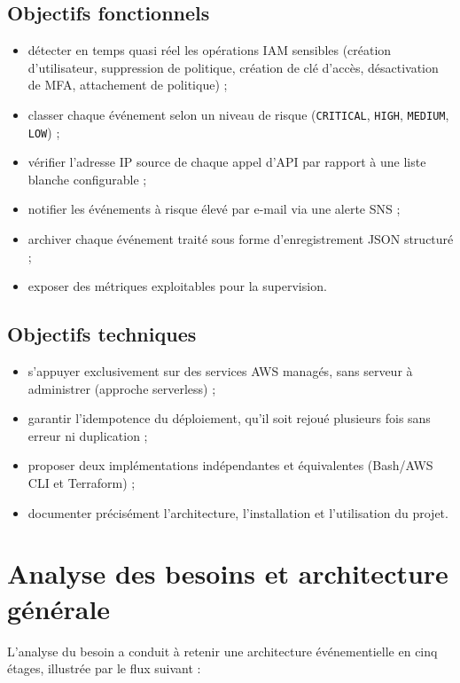 \documentclass[11pt,a4paper]{report}
\begin{document}
\subsection{Objectifs fonctionnels}
\begin{itemize}[leftmargin=1.4em]
  \item détecter en temps quasi réel les opérations IAM sensibles (création d'utilisateur, suppression de politique, création de clé d'accès, désactivation de MFA, attachement de politique) ;
  \item classer chaque événement selon un niveau de risque (\texttt{CRITICAL}, \texttt{HIGH}, \texttt{MEDIUM}, \texttt{LOW}) ;
  \item vérifier l'adresse IP source de chaque appel d'API par rapport à une liste blanche configurable ;
  \item notifier les événements à risque élevé par e-mail via une alerte SNS ;
  \item archiver chaque événement traité sous forme d'enregistrement JSON structuré ;
  \item exposer des métriques exploitables pour la supervision.
\end{itemize}

\subsection{Objectifs techniques}
\begin{itemize}[leftmargin=1.4em]
  \item s'appuyer exclusivement sur des services AWS managés, sans serveur à administrer (approche serverless) ;
  \item garantir l'idempotence du déploiement, qu'il soit rejoué plusieurs fois sans erreur ni duplication ;
  \item proposer deux implémentations indépendantes et équivalentes (Bash/AWS CLI et Terraform) ;
  \item documenter précisément l'architecture, l'installation et l'utilisation du projet.
\end{itemize}

\section{Analyse des besoins et architecture générale}

L'analyse du besoin a conduit à retenir une architecture événementielle en cinq étages, illustrée par le flux suivant :
\end{document}
